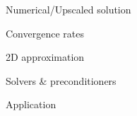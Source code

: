 \documentclass{beamer}
\begin{document}
\begin{frame}[t]{Numerical/Upscaled solution}

\end{frame}

\begin{frame}[t]{Convergence rates}

\end{frame}

\begin{frame}[t]{2D approximation}

\end{frame}

\begin{frame}[t]{Solvers \& preconditioners}

\end{frame}

\begin{frame}[t]{Application}

\end{frame}
\end{document}
